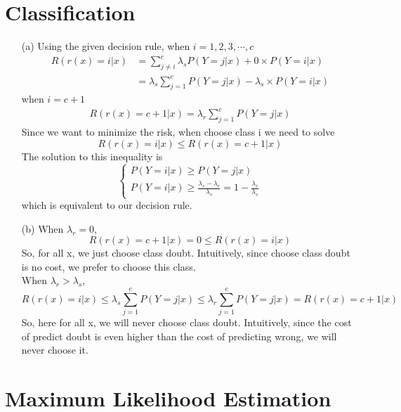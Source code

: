 \documentclass[a4paper,12pt]{article}
\begin{document}
\section{Classification}
\begin{itemize}
\item[(a)]
Using the given decision rule, when $i = 1, 2, 3, \cdots, c$
\begin{align*}
R(r(x) = i|x) 
&= \sum_{j \ne i}^c \lambda_s P(Y=j|x) + 0 \times P(Y=i|x) \\
&=  \lambda_s \sum_{j = 1}^c P(Y=j|x) - \lambda_s \times P(Y=i|x) 
\end{align*}
when $i = c+1$
\begin{align*}
R(r(x) = c+1|x) = \lambda_r \sum_{j = 1}^c P(Y=j|x)
\end{align*}
Since we want  to minimize the risk, when choose class i we need to solve 
$$
R(r(x) = i|x) \le R(r(x) = c+1|x) 
$$
The solution to this inequality is
$$\begin{cases}
P(Y = i|x) \ge P(Y = j|x) \\
P(Y = i|x) \ge \frac{\lambda_s - \lambda_r}{\lambda_s} = 1 - \frac{ \lambda_r}{\lambda_s} 
\end{cases}$$
which is equivalent to our decision rule.

\clearpage

\item[(b)]
When $\lambda_r = 0$, 
$$
R(r(x) = c+1|x) = 0 \le R(r(x) = i|x) 
$$
So, for all x, we just choose class doubt. Intuitively, since choose class doubt is no cost, we prefer to choose this class. \\

When $\lambda_r > \lambda_s$,
$$
R(r(x) = i|x)  \le  \lambda_s \sum_{j = 1}^c P(Y=j|x)  \le  \lambda_r \sum_{j = 1}^c P(Y=j|x) = R(r(x) = c+1|x) 
$$
So, here for all x, we will never choose class doubt. Intuitively, since the cost of predict doubt is even higher than the cost of predicting wrong, we will never choose it.
\end{itemize}



\clearpage
\section{Maximum Likelihood Estimation}
\end{document}

